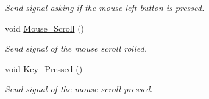 \begin{DoxyCompactItemize}
\begin{DoxyCompactList}\small\item\em Send signal asking if the mouse left button is pressed. \end{DoxyCompactList}\item 
\hypertarget{classQCustomLabel_aea283ddc963d921271109be3bcb82b6f}{void \hyperlink{classQCustomLabel_aea283ddc963d921271109be3bcb82b6f}{Mouse\-\_\-\-Scroll} ()}\label{classQCustomLabel_aea283ddc963d921271109be3bcb82b6f}

\begin{DoxyCompactList}\small\item\em Send signal of the mouse scroll rolled. \end{DoxyCompactList}\item 
\hypertarget{classQCustomLabel_a8c48808fd1d4287bf220df16f7c2feb5}{void \hyperlink{classQCustomLabel_a8c48808fd1d4287bf220df16f7c2feb5}{Key\-\_\-\-Pressed} ()}\label{classQCustomLabel_a8c48808fd1d4287bf220df16f7c2feb5}

\begin{DoxyCompactList}\small\item\em Send signal of the mouse scroll pressed. \end{DoxyCompactList}\end{DoxyCompactItemize}
